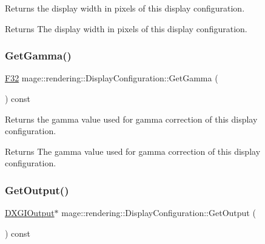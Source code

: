 Returns the display width in pixels of this display configuration.

\begin{DoxyReturn}{Returns}
The display width in pixels of this display configuration. 
\end{DoxyReturn}
\mbox{\label{classmage_1_1rendering_1_1_display_configuration_a84dec99b487839003fce7c9704dc031d}} 
\subsubsection{\texorpdfstring{Get\+Gamma()}{GetGamma()}}
{\footnotesize\ttfamily \mbox{\hyperlink{namespacemage_aa97e833b45f06d60a0a9c4fc22ae02c0}{F32}} mage\+::rendering\+::\+Display\+Configuration\+::\+Get\+Gamma (\begin{DoxyParamCaption}{ }\end{DoxyParamCaption}) const\hspace{0.3cm}{\ttfamily [noexcept]}}

Returns the gamma value used for gamma correction of this display configuration.

\begin{DoxyReturn}{Returns}
The gamma value used for gamma correction of this display configuration. 
\end{DoxyReturn}
\mbox{\label{classmage_1_1rendering_1_1_display_configuration_a727b2e5ebcc286bb2ae39fd1f1e69445}} 
\subsubsection{\texorpdfstring{Get\+Output()}{GetOutput()}}
{\footnotesize\ttfamily \mbox{\hyperlink{namespacemage_1_1rendering_aaf22d3893277a4bd8497f6ea69b01532}{D\+X\+G\+I\+Output}}$\ast$ mage\+::rendering\+::\+Display\+Configuration\+::\+Get\+Output (\begin{DoxyParamCaption}{ }\end{DoxyParamCaption}) const\hspace{0.3cm}{\ttfamily [noexcept]}}

